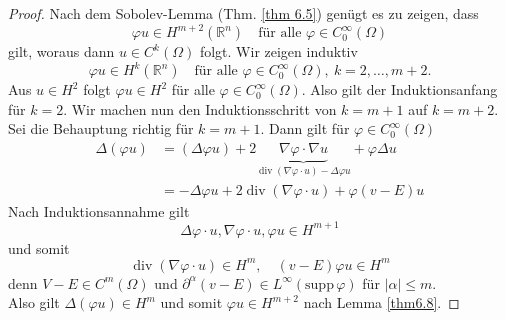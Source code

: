 \documentclass[
paper=a4,
bibtotocnumbered,
liststotocnumbered,
tablecaptionabove,
pointlessnumbers,
twoside,
openright,
10pt
]
{report}
\newcommand{\supp}{\mathrm{supp}\,}
\let\phi\varphi
\theoremstyle{definition}
\numberwithin{equation}{chapter}
\begin{document}
\begin{proof}
Nach dem Sobolev-Lemma (Thm. \ref{thm 6.5}) genügt es zu zeigen, dass
\begin{equation}
\phi u \in H^{m+2}(\mathbb R^n) \quad \text{für alle } \phi \in C_0^\infty(\Omega)
\end{equation}
gilt, woraus dann $u\in C^k(\Omega)$ folgt.
Wir zeigen induktiv
\begin{equation}
\phi u \in H^k(\mathbb R^n) \quad \text{für alle } \phi \in C_0^\infty(\Omega), \ k=2, \ldots, m+2.
\end{equation}
Aus $u\in H^2$ folgt $\phi u\in H^2$ für alle $\phi \in C_0^\infty(\Omega)$. Also gilt der Induktionsanfang für $k=2$. Wir machen nun den Induktionsschritt von $k=m+1$ auf $k=m+2$.\\
Sei die Behauptung richtig für $k=m+1$. Dann gilt für $\phi \in C_0^\infty(\Omega)$
\begin{align}
\Delta(\phi u) &= (\Delta \phi u) + 2\underbrace{\nabla \phi \cdot \nabla u}_{\operatorname{div}(\nabla \phi \cdot u)- \Delta \phi u} + \phi \Delta u\\
&= - \Delta \phi u + 2\operatorname{div} (\nabla \phi \cdot u) + \phi(v-E) u
\end{align}
Nach Induktionsannahme gilt
\begin{equation}
\Delta \phi \cdot u, \nabla \phi \cdot u, \phi u \in H^{m+1}
\end{equation}
und somit
\begin{equation}
\operatorname{div}(\nabla \phi \cdot u) \in H^m, \quad (v-E) \phi u \in H^m
\end{equation}
denn $V-E\in C^m(\Omega)$ und $\partial^\alpha(v-E)\in L^\infty(\supp \phi)$ für $|\alpha|\le m$.
\\
Also gilt $\Delta (\phi u) \in H^m$ und somit $\phi u\in H^{m+2}$ nach Lemma \ref{thm6.8}.

\end{proof}
\end{document}
